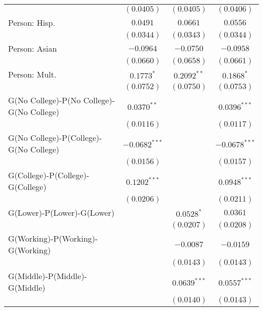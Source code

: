 \begin{center}
\begin{longtable}{l c c c}
                                          & $(0.0405)$      & $(0.0405)$     & $(0.0406)$      \\
Person: Hisp.                             & $0.0491$        & $0.0661$       & $0.0556$        \\
                                          & $(0.0344)$      & $(0.0343)$     & $(0.0344)$      \\
Person: Asian                             & $-0.0964$       & $-0.0750$      & $-0.0958$       \\
                                          & $(0.0660)$      & $(0.0658)$     & $(0.0661)$      \\
Person: Mult.                             & $0.1773^{*}$    & $0.2092^{**}$  & $0.1868^{*}$    \\
                                          & $(0.0752)$      & $(0.0750)$     & $(0.0753)$      \\
G(No College)-P(No College)-G(No College) & $0.0370^{**}$   &                & $0.0396^{***}$  \\
                                          & $(0.0116)$      &                & $(0.0117)$      \\
G(No College)-P(College)-G(No College)    & $-0.0682^{***}$ &                & $-0.0678^{***}$ \\
                                          & $(0.0156)$      &                & $(0.0157)$      \\
G(College)-P(College)-G(College)          & $0.1202^{***}$  &                & $0.0948^{***}$  \\
                                          & $(0.0206)$      &                & $(0.0211)$      \\
G(Lower)-P(Lower)-G(Lower)                &                 & $0.0528^{*}$   & $0.0361$        \\
                                          &                 & $(0.0207)$     & $(0.0208)$      \\
G(Working)-P(Working)-G(Working)          &                 & $-0.0087$      & $-0.0159$       \\
                                          &                 & $(0.0143)$     & $(0.0143)$      \\
G(Middle)-P(Middle)-G(Middle)             &                 & $0.0639^{***}$ & $0.0557^{***}$  \\
                                          &                 & $(0.0140)$     & $(0.0143)$      \\

\end{longtable}
\end{center}
